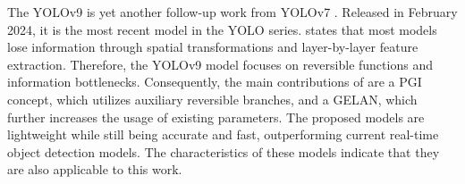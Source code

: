 The \ac{YOLO}v9 \cite{YOLOv9} is yet another follow-up work from \ac{YOLO}v7 \cite{yolov7}.
Released in February 2024, it is the most recent model in the \ac{YOLO} series.
\cite{YOLOv9} states that most models lose information through spatial transformations and layer-by-layer feature extraction.
Therefore, the \ac{YOLO}v9 model focuses on reversible functions and information bottlenecks.
Consequently, the main contributions of \cite{YOLOv9} are a \ac{PGI} concept, which utilizes auxiliary reversible branches, and a \ac{GELAN}, which further increases the usage of existing parameters.
The proposed models are lightweight while still being accurate and fast, outperforming current real-time object detection models.
The characteristics of these models indicate that they are also applicable to this work.
